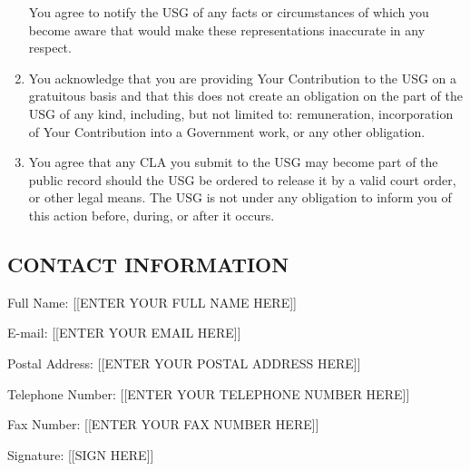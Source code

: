 \begin{enumerate}
  You agree to notify the USG of any facts or circumstances of which you
  become aware that would make these representations inaccurate in any
  respect.
\item
  You acknowledge that you are providing Your Contribution to the USG on
  a gratuitous basis and that this does not create an obligation on the
  part of the USG of any kind, including, but not limited to:
  remuneration, incorporation of Your Contribution into a Government
  work, or any other obligation.
\item
  You agree that any CLA you submit to the USG may become part of the
  public record should the USG be ordered to release it by a valid court
  order, or other legal means. The USG is not under any obligation to
  inform you of this action before, during, or after it occurs.
\end{enumerate}

\subsection{CONTACT INFORMATION}\label{contact-information}

Full Name: {[}{[}ENTER YOUR FULL NAME HERE{]}{]}

E-mail: {[}{[}ENTER YOUR EMAIL HERE{]}{]}

Postal Address: {[}{[}ENTER YOUR POSTAL ADDRESS HERE{]}{]}

Telephone Number: {[}{[}ENTER YOUR TELEPHONE NUMBER HERE{]}{]}

Fax Number: {[}{[}ENTER YOUR FAX NUMBER HERE{]}{]}

Signature: {[}{[}SIGN HERE{]}{]}
